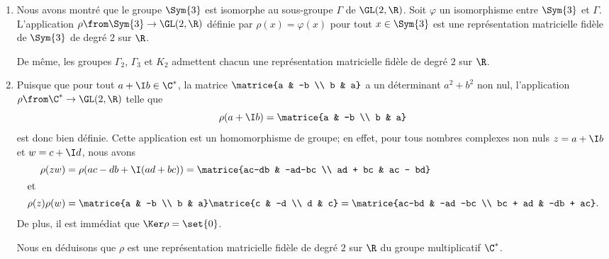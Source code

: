 \begin{enumerate}
  \item 
    Nous avons montré que le groupe $\Sym{3}$ est isomorphe au sous-groupe $\Gamma$ de $\GL(2,\R)$. 
    Soit $\varphi$ un isomorphisme entre $\Sym{3}$ et $\Gamma$.
    L'application $\rho\from\Sym{3}\to\GL(2,\R)$ définie par $\rho(x) = \varphi(x)$ pour tout $x\in\Sym{3}$ est une représentation matricielle fidèle de $\Sym{3}$ de degré $2$ sur $\R$.

    De même, les groupes $\Gamma_2$, $\Gamma_3$ et $K_2$ admettent chacun une représentation matricielle fidèle de degré $2$ sur $\R$. 
  
  \item
    Puisque que pour tout $a+\I b\in\C^*$, la matrice $\matrice{a & -b \\ b & a}$ a un déterminant $a^2+b^2$ non nul, l'application $\rho\from\C^*\to\GL(2,\R)$ telle que
    \[
      \rho(a+\I b) = \matrice{a & -b \\ b & a}
    \]
    est donc bien définie. 
    Cette application est un homomorphisme de groupe; en effet, pour tous nombres complexes non nuls $z = a+\I b$ et $w = c+\I d$, nous avons
    \begin{align*}
      \rho(zw) 
        &= \rho(ac-db + \I (ad + bc))
         = \matrice{ac-db & -ad-bc \\ ad + bc & ac - bd} \\
      \intertext{et}
      \rho(z)\rho(w)
        &= \matrice{a & -b \\ b & a}\matrice{c & -d \\ d & c}
         = \matrice{ac-bd & -ad -bc \\ bc + ad & -db + ac}.
    \end{align*}
    De plus, il est immédiat que $\Ker \rho = \set{0}$.

    Nous en déduisons que $\rho$ est une représentation matricielle fidèle de degré $2$ sur $\R$  du groupe multiplicatif $\C^*$.
\end{enumerate}

